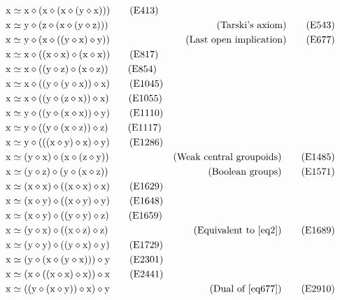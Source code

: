 \begin{align}
    \x &\formaleq \x \op (\x \op (\x \op (\y \op \x))) \label{eq413}\tag{E413} \\
    \x &\formaleq \y \op (\z \op (\x \op (\y \op \z))) & \hbox{(Tarski's axiom)} \label{eq543}\tag{E543} \\
    \x &\formaleq \y \op (\x \op ((\y \op \x) \op \y)) & \hbox{(Last open implication)} \label{eq677}\tag{E677} \\
    \x &\formaleq \x \op ((\x \op \x) \op (\x \op \x)) \label{eq817}\tag{E817} \\
    \x &\formaleq \x \op ((\y \op \z) \op (\x \op \z)) \label{eq854}\tag{E854}\\
    \x &\formaleq \x \op ((\y \op (\y \op \x)) \op \x) \label{eq1045}\tag{E1045} \\
    \x &\formaleq \x \op ((\y \op (\z \op \x)) \op \x) \label{eq1055}\tag{E1055} \\
    \x &\formaleq \y \op ((\y \op (\x \op \x)) \op \y) \label{eq1110}\tag{E1110} \\
    \x &\formaleq \y \op ((\y \op (\x \op \z)) \op \z) \label{eq1117}\tag{E1117} \\
    \x &\formaleq \y \op (((\x \op \y) \op \x) \op \y) \label{eq1286}\tag{E1286} \\
    \x &\formaleq (\y \op \x) \op (\x \op (\z \op \y)) & \hbox{(Weak central groupoids)}\label{eq1485}\tag{E1485} \\
    \x &\formaleq (\y \op \z) \op (\y \op (\x \op \z)) & \hbox{(Boolean groups)} \label{eq1571}\tag{E1571} \\
    \x &\formaleq (\x \op \x) \op ((\x \op \x) \op \x) \label{eq1629}\tag{E1629} \\
    \x &\formaleq (\x \op \y) \op ((\x \op \y) \op \y) \label{eq1648}\tag{E1648} \\
    \x &\formaleq (\x \op \y) \op ((\y \op \y) \op \z) \label{eq1659}\tag{E1659} \\
    \x &\formaleq (\y \op \x) \op ((\x \op \z) \op \z) & \hbox{(Equivalent to~\eqref{eq2})} \label{eq1689}\tag{E1689} \\
    \x &\formaleq (\y \op \y) \op ((\y \op \x) \op \y) \label{eq1729}\tag{E1729} \\
    \x &\formaleq (\y \op (\x \op (\y \op \x))) \op \y \label{eq2301}\tag{E2301} \\
        \x &\formaleq (\x \op ((\x \op \x) \op \x)) \op \x \label{eq2441}\tag{E2441} \\
        \x &\formaleq ((\y \op (\x \op \y)) \op \x) \op \y & \hbox{(Dual of \eqref{eq677})} \label{eq2910}\tag{E2910} \\

\end{align}
